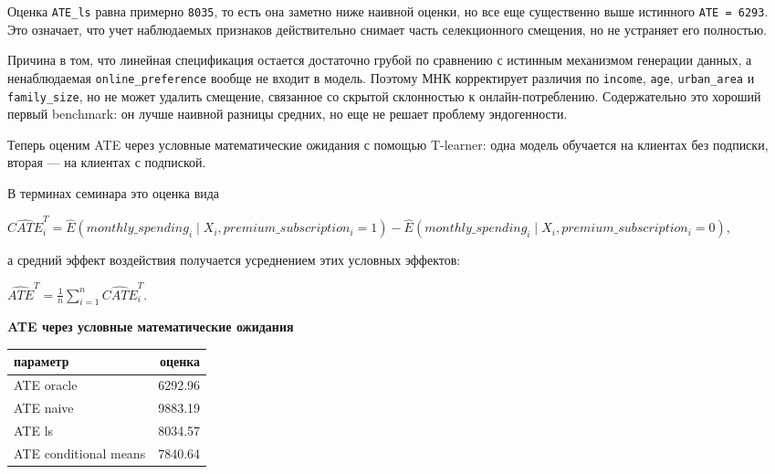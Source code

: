 \documentclass[11pt]{article}
\newcounter{none}
\begin{document}
    Оценка \texttt{ATE\_ls} равна примерно \texttt{8035}, то есть она
заметно ниже наивной оценки, но все еще существенно выше истинного
\texttt{ATE\ =\ 6293}. Это означает, что учет наблюдаемых признаков
действительно снимает часть селекционного смещения, но не устраняет его
полностью.

Причина в том, что линейная спецификация остается достаточно грубой по
сравнению с истинным механизмом генерации данных, а ненаблюдаемая
\texttt{online\_preference} вообще не входит в модель. Поэтому МНК
корректирует различия по \texttt{income}, \texttt{age},
\texttt{urban\_area} и \texttt{family\_size}, но не может удалить
смещение, связанное со скрытой склонностью к онлайн-потреблению.
Содержательно это хороший первый benchmark: он лучше наивной разницы
средних, но еще не решает проблему эндогенности.

    Теперь оценим ATE через условные математические ожидания с помощью
T-learner: одна модель обучается на клиентах без подписки, вторая --- на
клиентах с подпиской.

В терминах семинара это оценка вида

\begin{center}
\begin{adjustbox}{max width=\linewidth}
\(\displaystyle \widehat{CATE}^{T}_i = \widehat{E}(monthly\_spending_i \mid X_i, premium\_subscription_i = 1) - \widehat{E}(monthly\_spending_i \mid X_i, premium\_subscription_i = 0),\)
\end{adjustbox}
\end{center}

а средний эффект воздействия получается усреднением этих условных
эффектов:

\begin{center}
\begin{adjustbox}{max width=\linewidth}
\(\displaystyle \widehat{ATE}^{T} = \frac{1}{n}\sum\limits_{i=1}^{n} \widehat{CATE}^{T}_i.\)
\end{adjustbox}
\end{center}

    \textbf{ATE через условные математические ожидания}

{\def\LTcaptype{none} %
\begin{longtable}[]{@{}lr@{}}
\toprule\noalign{}
параметр & оценка \\
\midrule\noalign{}
\endhead
\bottomrule\noalign{}
\endlastfoot
ATE oracle & 6292.96 \\
ATE naive & 9883.19 \\
ATE ls & 8034.57 \\
ATE conditional means & 7840.64 \\
\end{longtable}
}
\end{document}
